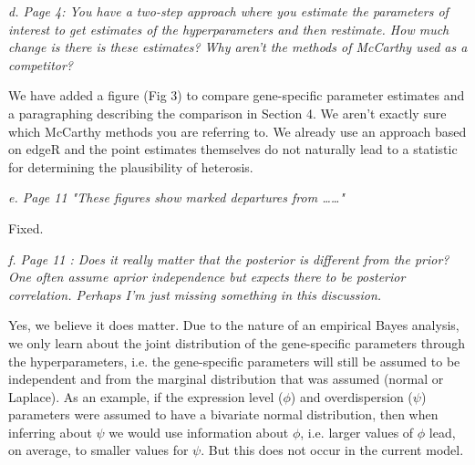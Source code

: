 \documentclass{article}
\newcommand{\comment}[1]{\textit{#1}}
\newcommand{\response}[1]{#1}
\begin{document}
\comment{d.      Page 4: You have a two-step approach where you estimate the parameters of interest to get estimates of the hyperparameters and then restimate.  How much change is there is these estimates?  Why aren't the methods of McCarthy used as a competitor?}

\response{We have added a figure (Fig 3) to compare gene-specific parameter estimates and a paragraphing describing the comparison in Section 4. We aren't exactly sure which McCarthy methods you are referring to. We already use an approach based on edgeR and the point estimates themselves do not naturally lead to a statistic for determining the plausibility of heterosis.}

\comment{e.      Page 11 "These figures show marked departures from ……"}

\response{Fixed.}

\comment{f.      Page 11 : Does it really matter that the posterior is different from the prior?  One often assume aprior independence but expects there to be posterior correlation.  Perhaps I'm just missing something in this discussion.}

\response{Yes, we believe it does matter. Due to the nature of an empirical Bayes analysis, we only learn about the joint distribution of the gene-specific parameters through the hyperparameters, i.e. the gene-specific parameters will still be assumed to be independent and from the marginal distribution that was assumed (normal or Laplace). As an example, if the expression level ($\phi$) and overdispersion ($\psi$) parameters were assumed to have a bivariate normal distribution, then when inferring about $\psi$ we would use information about $\phi$, i.e. larger values of $\phi$ lead, on average, to smaller values for $\psi$. But this does not occur in the current model.}
\end{document}
